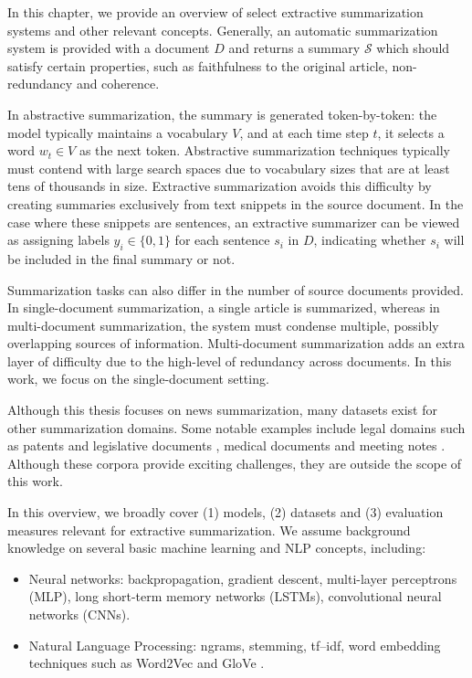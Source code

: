 In this chapter, we provide an overview of select extractive summarization systems and other relevant concepts. Generally, an automatic summarization system is provided with a document $D$ and returns a summary $\mathcal{S}$ which should satisfy certain properties, such as faithfulness to the original article, non-redundancy and coherence. 

In abstractive summarization, the summary is generated token-by-token: the model typically maintains a vocabulary $V$, and at each time step $t$, it selects a word $w_t \in V$ as the next token. Abstractive summarization techniques typically must contend with large search spaces due to vocabulary sizes that are at least tens of thousands in size. Extractive summarization avoids this difficulty by creating summaries exclusively from text snippets in the source document. In the case where these snippets are sentences, an extractive summarizer can be viewed as assigning labels $y_i \in \{0, 1\}$ for each sentence $s_i$ in $D$, indicating whether $s_i$ will be included in the final summary or not.

Summarization tasks can also differ in the number of source documents provided. In single-document summarization, a single article is summarized, whereas in multi-document summarization, the system must condense multiple, possibly overlapping sources of information. Multi-document summarization adds an extra layer of difficulty due to the high-level of redundancy across documents. In this work, we focus on the single-document setting.

Although this thesis focuses on news summarization, many datasets exist for other summarization domains. Some notable examples include legal domains such as patents and legislative documents \parencite{bigpatent, billsum}, medical documents \parencite{kedzie2018content, zhang2018radsum} and meeting notes \parencite{meeting-corpus}. Although these corpora provide exciting challenges, they are outside the scope of this work.

In this overview, we broadly cover (1) models, (2) datasets and (3) evaluation measures relevant for extractive summarization. We assume background knowledge on several basic machine learning and NLP concepts, including:
\begin{itemize}
    \item Neural networks: backpropagation, gradient descent, multi-layer perceptrons (MLP), long short-term memory networks (LSTMs), convolutional neural networks (CNNs).
    \item Natural Language Processing: ngrams, stemming, tf--idf, word embedding techniques such as Word2Vec and GloVe \parencite{word2vec, we2_pennington2014glove}.
\end{itemize}

